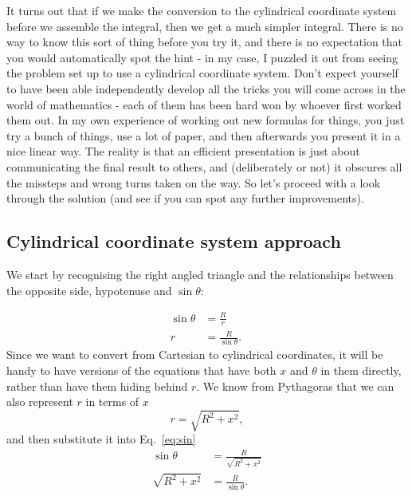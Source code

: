 \documentclass{tufte-handout}
\begin{document}
It turns out that if we make the conversion to the cylindrical coordinate system before we assemble the integral, then we get a much simpler integral. There is no way to know this sort of thing before you try it, and there is no expectation that you would automatically spot the hint - in my case, I puzzled it out from seeing the problem set up to use a cylindrical coordinate system. Don't expect yourself to have been able independently develop all the tricks you will come across in the world of mathematics - each of them has been hard won by whoever first worked them out. In my own experience of working out new formulas for things, you just try a bunch of things, use a lot of paper, and then afterwards you present it in a nice linear way. The reality is that an efficient presentation is just about communicating the final result to others, and (deliberately or not) it obscures all the missteps and wrong turns taken on the way. So let's proceed with a look through the solution (and see if you can spot any further improvements).

\subsection{Cylindrical coordinate system approach}

We start by recognising the right angled triangle and the relationships between the opposite side, hypotenuse and $\sin\theta$:
\begin{marginfigure}

\end{marginfigure}
\begin{subequations}
\label{eq:sin}
\begin{align}
\sin\theta & = \frac{R}{r} \label{eq:sina}\\
r & = \frac{R}{\sin\theta}. \label{eq:sinb}\ 
\end{align}
\end{subequations}
Since we want to convert from Cartesian to cylindrical coordinates, it will be handy to have versions of the equations that have both $x$ and $\theta$ in them directly, rather than have them hiding behind $r$. We know from Pythagoras that we can also represent $r$ in terms of $x$
\begin{equation}
\label{eq:r}
r = \sqrt{R^2 + x^2}, 
\end{equation}
and then substitute it into Eq.~\ref{eq:sin} 
\begin{subequations}
\label{eq:sinr}
\begin{align}
\sin\theta & = \frac{R}{\sqrt{R^2 + x^2}} \label{eq:sinra} \\
\sqrt{R^2 + x^2}  & = \frac{R}{\sin\theta} \label{eq:sinrb}. 
\end{align}
\end{subequations}
\end{document}
